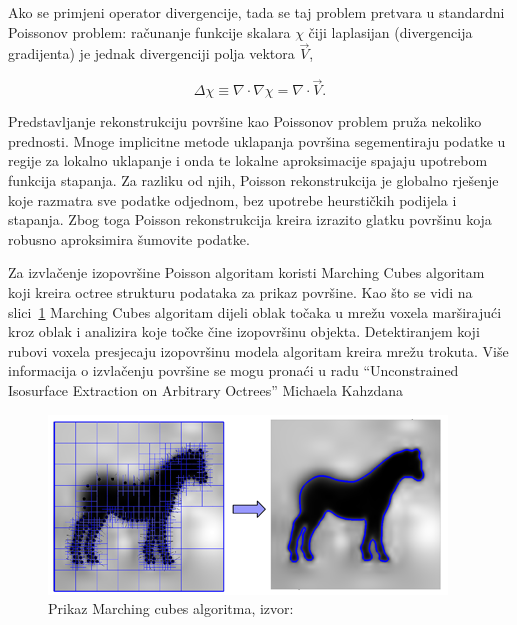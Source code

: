 Ako se primjeni operator divergencije, tada se taj problem pretvara u
standardni Poissonov problem: računanje funkcije skalara \(\chi\) čiji
laplasijan (divergencija gradijenta) je jednak divergenciji polja
vektora \(\vec{V}\),

\begin{equation*}
\Delta \chi \equiv \nabla \cdot \nabla\chi = \nabla \cdot \vec{V}.
\end{equation*}

Predstavljanje rekonstrukciju površine kao Poissonov problem pruža
nekoliko prednosti. Mnoge implicitne metode uklapanja površina
segementiraju podatke u regije za lokalno uklapanje i onda te lokalne
aproksimacije spajaju upotrebom funkcija stapanja. Za razliku od njih,
Poisson rekonstrukcija je globalno rješenje koje razmatra sve podatke
odjednom, bez upotrebe heurstičkih podijela i stapanja. Zbog toga
Poisson rekonstrukcija kreira izrazito glatku površinu koja robusno
aproksimira šumovite podatke.  

Za izvlačenje izopovršine Poisson algoritam koristi Marching Cubes
algoritam~\cite{Lorensen87marchingcubes} koji kreira octree strukturu
podataka za prikaz površine.  Kao što se vidi na
slici~\ref{fig:poisson-marching-cubes.png} Marching Cubes algoritam
dijeli oblak točaka u mrežu voxela marširajući kroz oblak i analizira
koje točke čine izopovršinu objekta.  Detektiranjem koji rubovi voxela
presjecaju izopovršinu modela algoritam kreira mrežu trokuta. Više
informacija o izvlačenju površine se mogu pronaći u radu “Unconstrained
Isosurface Extraction on Arbitrary Octrees” Michaela
Kahzdana~\cite{Kazhdan:2007}

\begin{figure}[h]
\centering
\includegraphics[scale=0.8]{figures/poisson-marching-cubes.png}
\caption[]{Prikaz Marching cubes algoritma, izvor:~\cite{Kazhdan:2007}}
\label{fig:poisson-marching-cubes.png}
\end{figure}


